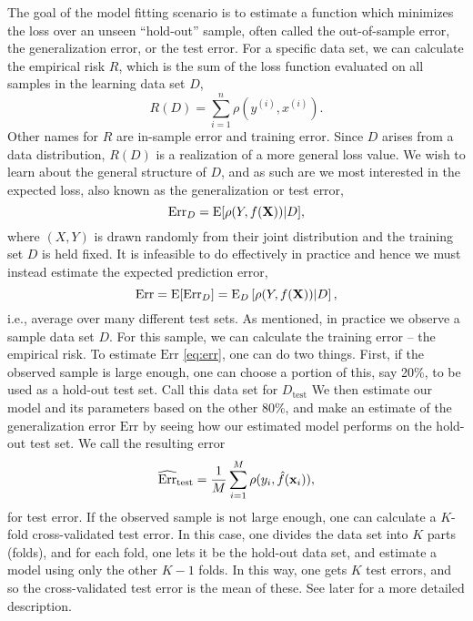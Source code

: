 The goal of the model fitting scenario is to estimate a function which minimizes the loss over an unseen ``hold-out'' sample, often called the out-of-sample error, the generalization error, or the test error. For a specific data set, we can calculate the empirical risk $R$, which is the sum of the loss function evaluated on all samples in the learning data set $D$,
\begin{equation}\label{eq:empirical-risk-2}
    R(D)=\sum_{i=1}^n\rho(y^{(i)},x^{(i)}).
\end{equation}
Other names for $R$ are in-sample error and training error. Since $D$ arises from a data distribution, $R(D)$ is a realization of a more general loss value. We wish to learn about the general structure of $D$, and as such are we most interested in the expected loss, also known as the generalization or test error,
\begin{equation*}
    \text{Err}_{D}=\operatorname{E}[\rho(Y,f(\mathbf{X}))|D],
\end{equation*}
where $(X,Y)$ is drawn randomly from their joint distribution and the training set $D$ is held fixed. It is infeasible to do effectively in practice
and hence we must instead estimate the expected prediction error,
\begin{equation}\label{eq:err}
    \text{Err}=\operatorname{E}[\text{Err}_D]=\operatorname{E}_D\left[\rho(Y,f(\mathbf{X}))|D\right],
\end{equation}
i.e., average over many different test sets. As mentioned, in practice we observe a sample data set $D$. For this sample, we can calculate the training error -- the empirical risk. To estimate $\text{Err}$ \eqref{eq:err}, one can do two things. First, if the observed sample is large enough, one can choose a portion of this, say 20\%, to be used as a hold-out test set. Call this data set for $D_{\text{test}}$ We then estimate our model and its parameters based on the other 80\%, and make an estimate of the generalization error $\text{Err}$ by seeing how our estimated model performs on the hold-out test set. We call the resulting error
\begin{equation*}
    \widehat{\text{Err}}_{\text{test}}=\frac{1}{M}\sum_{i=1}^M \rho(y_i,\hat{f}(\mathbf{x}_i)),
\end{equation*}
for test error. If the observed sample is not large enough, one can calculate a $K$-fold cross-validated test error. In this case, one divides the data set into $K$ parts (folds), and for each fold, one lets it be the hold-out data set, and estimate a model using only the other $K-1$ folds. In this way, one gets $K$ test errors, and so the cross-validated test error is the mean of these. See later for a more detailed description.

